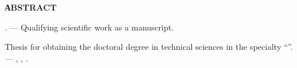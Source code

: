 
\clearpage

\begin{center}
\textbf{АBSTRACT}
\end{center}

\medskip

\textit{\dissauthorEn} \booknameEn.
---
Qualifying scientific work as a manuscript.

Thesis for obtaining the doctoral degree in technical sciences in the specialty
\dissSpecId ``\dissSpecEn''. --- \institutionEn, \belongEn, \bookyear.

